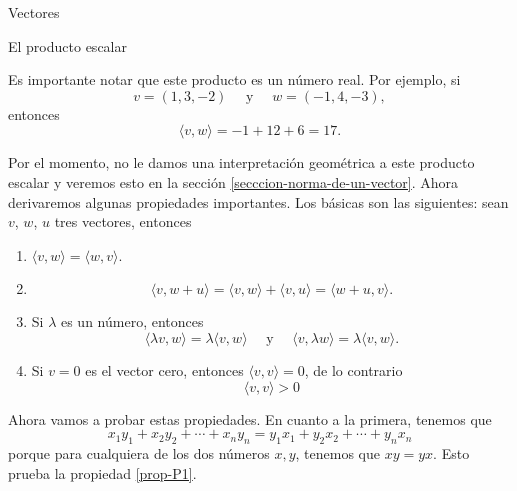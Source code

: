 \documentclass[a4paper,12pt,twoside,spanish]{amsbook}
\theoremstyle{definition}
\theoremstyle{remark}
\begin{document}
\begin{chapter}{Vectores}
\begin{section}{El producto escalar}
		
		
		Es importante notar  que este producto es un número real. Por ejemplo, si
		\begin{equation*}
			v= (1, 3, - 2) \quad\text{ y } \quad w= (- 1, 4, - 3),
		\end{equation*}
		entonces
		\begin{equation*}
			\langle v , w \rangle= - 1 + 12 + 6 = 17.
		\end{equation*}
		
		Por el momento, no le damos una interpretación geométrica a este producto escalar y veremos esto en la sección \ref{secccion-norma-de-un-vector}. Ahora derivaremos algunas propiedades importantes. Los básicas son las siguientes: sean $v$, $w$, $u$  tres vectores, entonces
		
		
		\begin{enumerate}[label=\textbf{P\arabic*.},ref=P\arabic*]
			\item\label{prop-P1}	$\langle v , w \rangle = \langle w , v \rangle$.
			\item\label{prop-P2} 
			\begin{equation*}
				\langle v , w + u \rangle =\langle v , w \rangle + \langle v , u \rangle = \langle w +u , v \rangle.
			\end{equation*}
			\item\label{prop-P3} Si $\lambda$ es un número, entonces 
			\begin{equation*}
				\langle \lambda v , w \rangle = \lambda \langle v , w \rangle \quad \text{ y } \quad  \langle v , \lambda w \rangle = \lambda \langle v , w \rangle.
			\end{equation*}
			\item\label{prop-P4} Si $v=0$ es el vector cero, entonces $\langle v , v \rangle =0$,  de lo contrario
			\begin{equation*}
				\langle v , v \rangle >0
			\end{equation*}
		\end{enumerate}
		
		Ahora vamos a probar estas propiedades. En cuanto a la primera, tenemos que
		\begin{equation*}
			x_1y_1 + x_2y_2+\cdots+x_ny_n = y_1x_1 + y_2x_2+\cdots+y_nx_n
		\end{equation*}
		porque para cualquiera de los dos números $x, y$, tenemos que $xy=yx$. Esto prueba la propiedad \ref{prop-P1}. 
		

\end{section}
\end{chapter}
\end{document}
